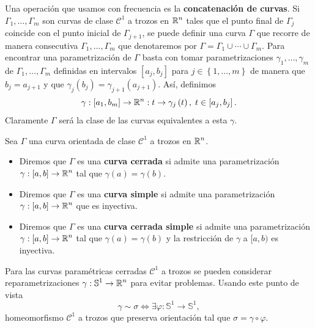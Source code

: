 Una operación que usamos con frecuencia es la \textbf{concatenación de curvas}. Si $\displaystyle \Gamma_{1}, \ldots, \Gamma_{m} $ son curvas de clase $\displaystyle \mathcal{C}^{1} $ a trozos en $\displaystyle \mathbb{R}^{n} $ tales que el punto final de $\displaystyle \Gamma_{j} $ coincide con el punto inicial de $\displaystyle \Gamma_{j + 1} $, se puede definir una curva $\displaystyle \Gamma $ que recorre de manera consecutiva $\displaystyle \Gamma_{1} , \ldots, \Gamma_{m} $ que denotaremos por $\displaystyle \Gamma = \Gamma_{1} \cup \cdots \cup \Gamma_{m} $. 
Para encontrar una parametrización de $\displaystyle \Gamma  $ basta con tomar parametrizaciones $\displaystyle \gamma_{1}, \ldots, \gamma_{m} $ de $\displaystyle \Gamma_{1}, \ldots, \Gamma_{m} $ definidas en intervalos $\displaystyle \left[a_{j}, b_{j}\right]  $ para $\displaystyle j \in \left\{ 1, \ldots, m\right\}  $ de manera que $\displaystyle b_{j}=a_{j+1} $ y que $\displaystyle \gamma_{j}\left(b_{j}\right)=\gamma_{j+1}\left(a_{j+1}\right) $. Así, definimos
\[\gamma : [a_{1}, b_{m}] \to \mathbb{R}^{n} : t \to \gamma_{j}\left(t\right), \; t \in \left[a_{j}, b_{j}\right]  .\]
Claramente $\displaystyle \Gamma $ será la clase de las curvas equivalentes a esta $\displaystyle \gamma  $. 
\begin{definition}
Sea $\displaystyle \Gamma $ una curva orientada de clase $\displaystyle \mathcal{C}^{1} $ a trozos en $\displaystyle \mathbb{R}^{n} $. 
\begin{itemize}
	\item Diremos que $\displaystyle \Gamma $ es una \textbf{curva cerrada} si admite una parametrización $\displaystyle \gamma : \left[a,b\right] \to \mathbb{R}^{n} $ tal que $\displaystyle \gamma\left(a\right)=\gamma\left(b\right) $.
	\item Diremos que $\displaystyle \Gamma $ es una \textbf{curva simple} si admite una parametrización $\displaystyle \gamma : \left[a,b\right] \to \mathbb{R}^{n} $ que es inyectiva.
	\item Diremos que $\displaystyle \Gamma $ es una \textbf{curva cerrada simple} si admite una parametrización $\displaystyle \gamma : \left[a,b\right] \to \mathbb{R}^{n} $ tal que $\displaystyle \gamma\left(a\right)=\gamma\left(b\right) $ y la restricción de $\displaystyle \gamma  $ a $\displaystyle [a,b) $ es inyectiva.
\end{itemize}
\end{definition}
\begin{observation}
Para las curvas paramétricas cerradas $\displaystyle \mathcal{C}^{1} $ a trozos se pueden considerar reparametrizaciones $\displaystyle \gamma : \mathbb{S}^{1} \to \mathbb{R}^{n} $ para evitar problemas. Usando este punto de vista
\[\gamma \sim \sigma \iff \exists \varphi : \mathbb{S}^{1} \to \mathbb{S}^{1} ,\]
homeomorfismo $\displaystyle \mathcal{C}^{1} $ a trozos que preserva orientación tal que $\displaystyle \sigma =\gamma\circ\varphi $. 
\end{observation}
